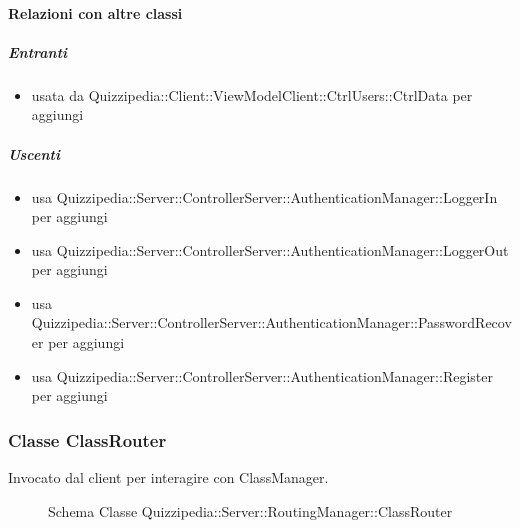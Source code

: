 \paragraph{Relazioni con altre classi}
\subparagraph{Entranti}
\begin{itemize}
\item usata da Quizzipedia::Client::ViewModelClient::CtrlUsers::CtrlData per aggiungi
\end{itemize}
\subparagraph{Uscenti}
\begin{itemize}
\item usa Quizzipedia::Server::ControllerServer::AuthenticationManager::LoggerIn per aggiungi
\item usa Quizzipedia::Server::ControllerServer::AuthenticationManager::LoggerOut per aggiungi
\item usa Quizzipedia::Server::ControllerServer::AuthenticationManager::PasswordRecover per aggiungi
\item usa Quizzipedia::Server::ControllerServer::AuthenticationManager::Register per aggiungi
\end{itemize}
\subsubsection{Classe ClassRouter}
Invocato dal client per interagire con ClassManager.
\begin{figure}[H]
\centering
\noindent{}
\caption[Schema Classe ClassRouter]{Schema Classe Quizzipedia::Server::RoutingManager::ClassRouter}
\end{figure}
